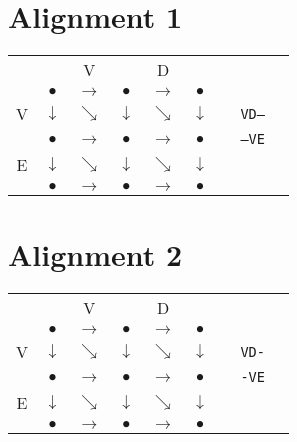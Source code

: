 \documentclass[landscape]{foils}
\begin{document}
\myNewSlide
\section*{Alignment 1}

{
\huge
\begin{center}
\begin{tabular}{cccccccp{1in}c}
   &              & V            &  & D & \\   
   & {\color{red} $\bullet$}      & {\color{red}$\rightarrow$}   & {\color{red}$\bullet$} &   {\color{red}$\rightarrow$} & {\color{red}$\bullet$}  \\
V  & {\color{black} $\downarrow$} & {\color{black}$\searrow$}    & {\color{black} $\downarrow$ } & {\color{black}$\searrow$}    & {\color{red} $\downarrow$ }  && {\tt VD--}\\
   & {\color{black} $\bullet$ }   & {\color{black}$\rightarrow$} & {\color{black}  $\bullet$ }   & {\color{black}$\rightarrow$} & {\color{red}  $\bullet$ }  && {\tt --VE} \\   
E  & {\color{black} $\downarrow$} & {\color{black}$\searrow$}    & {\color{black} $\downarrow$ } & {\color{black}$\searrow$}    & {\color{red} $\downarrow$ }  \\
   & {\color{black} $\bullet$ }   & {\color{black}$\rightarrow$} & {\color{black}  $\bullet$ }   & {\color{black}$\rightarrow$} & {\color{red}  $\bullet$ } \\   
\end{tabular}
\end{center}
}

\myNewSlide
\section*{Alignment 2}

{
\huge
\begin{center}
\begin{tabular}{cccccccp{1in}c}
   &              & V            &  & D & \\   
   & {\color{red} $\bullet$}      & {\color{red}$\rightarrow$}   & {\color{red}$\bullet$}        &   {\color{black}$\rightarrow$} & {\color{black}$\bullet$} \\
V  & {\color{black} $\downarrow$} & {\color{black}$\searrow$}    & {\color{black} $\downarrow$ } & {\color{red}$\searrow$}    & {\color{black} $\downarrow$ }  & & {\tt VD-} \\
   & {\color{black} $\bullet$ }   & {\color{black}$\rightarrow$} & {\color{black}  $\bullet$ }   & {\color{black}$\rightarrow$} & {\color{red}  $\bullet$ } & & {\tt -VE} \\   
E  & {\color{black} $\downarrow$} & {\color{black}$\searrow$}    & {\color{black} $\downarrow$ } & {\color{black}$\searrow$}    & {\color{red} $\downarrow$ }  \\
   & {\color{black} $\bullet$ }   & {\color{black}$\rightarrow$} & {\color{black}  $\bullet$ }   & {\color{black}$\rightarrow$} & {\color{red}  $\bullet$ } \\   
\end{tabular}
\end{center}
}
\end{document}
